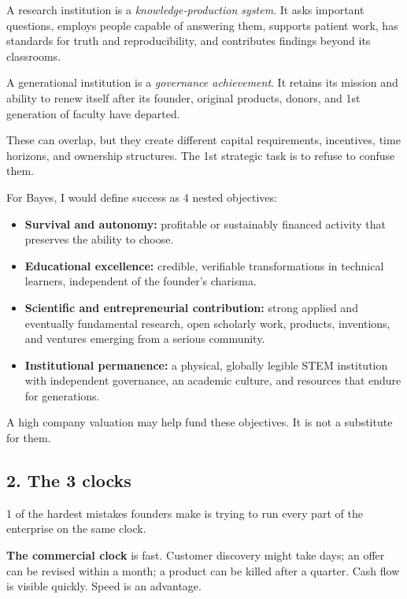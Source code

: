 A research institution is a \textit{knowledge-production system}. It asks important questions, employs people capable of answering them, supports patient work, has standards for truth and reproducibility, and contributes findings beyond its classrooms.

A generational institution is a \textit{governance achievement}. It retains its mission and ability to renew itself after its founder, original products, donors, and 1st generation of faculty have departed.

These can overlap, but they create different capital requirements, incentives, time horizons, and ownership structures. The 1st strategic task is to refuse to confuse them.

For Bayes, I would define success as 4 nested objectives:

\begin{itemize}[leftmargin=*,itemsep=1.5pt]
  \item \textbf{Survival and autonomy:} profitable or sustainably financed activity that preserves the ability to choose.
  \item \textbf{Educational excellence:} credible, verifiable transformations in technical learners, independent of the founder's charisma.
  \item \textbf{Scientific and entrepreneurial contribution:} strong applied and eventually fundamental research, open scholarly work, products, inventions, and ventures emerging from a serious community.
  \item \textbf{Institutional permanence:} a physical, globally legible STEM institution with independent governance, an academic culture, and resources that endure for generations.
\end{itemize}

A high company valuation may help fund these objectives. It is not a substitute for them.

\subsection{2. The 3 clocks}

1 of the hardest mistakes founders make is trying to run every part of the enterprise on the same clock.

\textbf{The commercial clock} is fast. Customer discovery might take days; an offer can be revised within a month; a product can be killed after a quarter. Cash flow is visible quickly. Speed is an advantage.

